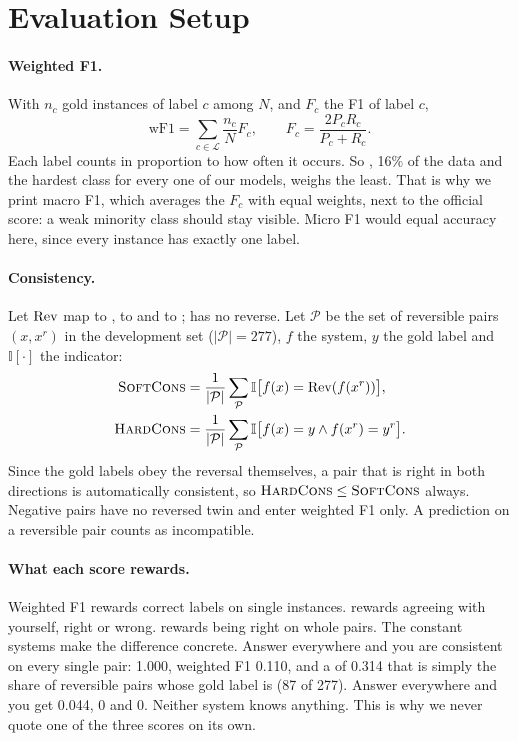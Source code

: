 \section{Evaluation Setup}
\label{sec:evaluation}

\paragraph{Weighted F1.}
With $n_c$ gold instances of label $c$ among $N$, and $F_c$ the F1 of label $c$,
\begin{equation}
\text{wF1} = \sum_{c \in \mathcal{L}} \frac{n_c}{N} F_c, \qquad F_c = \frac{2 P_c R_c}{P_c + R_c}.
\end{equation}
Each label counts in proportion to how often it occurs. So \NO{}, 16\% of the data and the hardest class for every one of our models, weighs the least. That is why we print macro F1, which averages the $F_c$ with equal weights, next to the official score: a weak minority class should stay visible. Micro F1 would equal accuracy here, since every instance has exactly one label.

\paragraph{Consistency.}
Let $\operatorname{Rev}$ map \EQ{} to \EQ{}, \FW{} to \BW{} and \BW{} to \FW{}; \NO{} has no reverse. Let $\mathcal{P}$ be the set of reversible pairs $(x, x^{r})$ in the development set ($|\mathcal{P}| = 277$), $f$ the system, $y$ the gold label and $\mathbb{I}[\cdot]$ the indicator:
\begingroup\small
\begin{align}
\textsc{SoftCons} &= \frac{1}{|\mathcal{P}|} \sum_{\mathcal{P}} \mathbb{I}\big[f(x) = \operatorname{Rev}(f(x^{r}))\big], \\
\textsc{HardCons} &= \frac{1}{|\mathcal{P}|} \sum_{\mathcal{P}} \mathbb{I}\big[f(x) = y \wedge f(x^{r}) = y^{r}\big].
\end{align}
\endgroup
Since the gold labels obey the reversal themselves, a pair that is right in both directions is automatically consistent, so $\textsc{HardCons} \le \textsc{SoftCons}$ always. Negative pairs have no reversed twin and enter weighted F1 only. A \NO{} prediction on a reversible pair counts as incompatible.

\paragraph{What each score rewards.}
Weighted F1 rewards correct labels on single instances. \SoftCons{} rewards agreeing with yourself, right or wrong. \HardCons{} rewards being right on whole pairs. The constant systems make the difference concrete. Answer \EQ{} everywhere and you are consistent on every single pair: \SoftCons{} 1.000, weighted F1 0.110, and a \HardCons{} of 0.314 that is simply the share of reversible pairs whose gold label is \EQ{} (87 of 277). Answer \NO{} everywhere and you get 0.044, 0 and 0. Neither system knows anything. This is why we never quote one of the three scores on its own.

